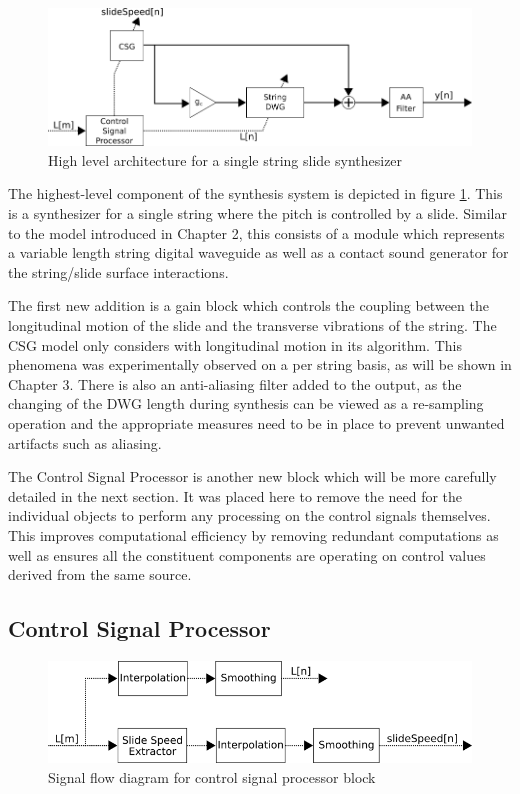 \documentclass[../main.tex]{subfiles}
\begin{document}
\begin{figure}[h]
    \centering
    \includegraphics[scale=.65]{./images/diagrams/slideSynth.png}
    \caption{High level architecture for a single string slide synthesizer}
    \label{fig:slide_synth}
\end{figure}

The highest-level component of the synthesis system is depicted in figure \ref{fig:slide_synth}. This is a synthesizer for a single string where the pitch is controlled by a slide. Similar to the model introduced in Chapter 2, this consists of a module which represents a variable length string digital waveguide as well as a contact sound generator for the string/slide surface interactions. 

The first new addition is a gain block which controls the coupling between the longitudinal motion of the slide and the transverse vibrations of the string. The CSG model only considers with longitudinal motion in its algorithm. This phenomena was experimentally observed on a per string basis, as will be shown in Chapter 3. There is also an anti-aliasing filter added to the output, as the changing of the DWG length during synthesis can be viewed as a re-sampling operation and the appropriate measures need to be in place to prevent unwanted artifacts such as aliasing. 

The Control Signal Processor is another new block which will be more carefully detailed in the next section. It was placed here to remove the need for the individual objects to perform any processing on the control signals themselves. This improves computational efficiency by removing redundant computations as well as ensures all the constituent components are operating on control values derived from the same source.

\subsection{Control Signal Processor}

\begin{figure}[h]
    \centering
    \includegraphics[scale=.65]{./images/diagrams/controlSignalProcessor.png}
    \caption{Signal flow diagram for control signal processor block}
    \label{fig:CSP}
\end{figure}
\end{document}
